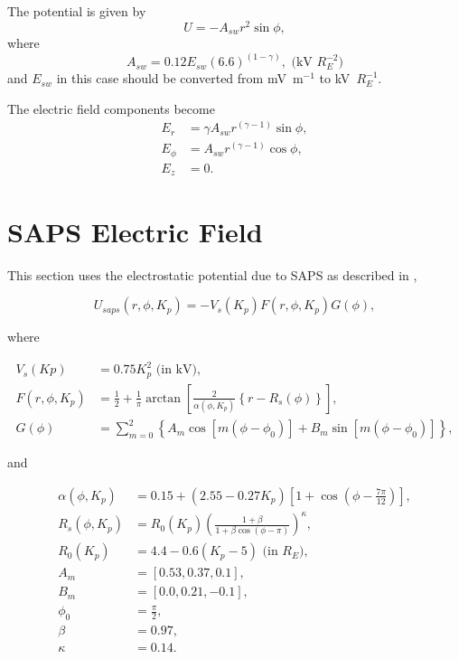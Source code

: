 \documentclass[]{article}
\begin{document}
The potential is given by 
\begin{equation}
	U = -A_{sw} r^2 \sin{\phi},
\end{equation}
where 
\begin{equation}
	A_{sw} = 0.12 E_{sw} (6.6)^{(1-\gamma)}, \text{ (kV $R_E^{-2}$)}
\end{equation}
and $E_{sw}$ in this case should be converted from mV~m$^{-1}$ to kV~$R_E^{-1}$.

The electric field components become
\begin{align}
E_r &= \gamma A_{sw} r^{(\gamma-1)}\sin{\phi},\\
E_\phi &= A_{sw} r^{(\gamma-1)} \cos{\phi},\\
E_z &= 0.
\end{align}


\section{SAPS Electric Field}

	This section uses the electrostatic potential due to SAPS as described in \citet{Goldstein2005},
	
	\begin{equation}
		U_{saps}(r,\phi,K_p) = -V_s(K_p) F(r,\phi,K_p) G(\phi),
	\end{equation}

	where
	
	\begin{align}
		V_s(Kp) &= 0.75 K_p^2 \text{ (in kV)}, \\
		F(r,\phi,K_p) &= \frac{1}{2} + \frac{1}{\pi}\arctan{\left[\frac{2}{\alpha(\phi,K_p)}\left\{ r - R_s(\phi)\right\}\right]}, \\
		G(\phi) &= \sum_{m=0}^{2} \left\{A_m \cos{[m(\phi - \phi_0)]} + B_m \sin{[m(\phi-\phi_0)]} \right\},
	\end{align}
	
	and
	
	\begin{align}
		\alpha(\phi,K_p) &= 0.15 + (2.55 - 0.27 K_p)\left[1 + \cos{\left(\phi - \frac{7\pi}{12}\right)}\right], \\
		R_s(\phi,K_p) &= R_0(K_p)\left(\frac{1+\beta}{1 + \beta\cos{(\phi-\pi)}}\right)^\kappa, \\
		R_0(K_p) &= 4.4 - 0.6(K_p - 5) \text{ (in $R_E$)},\\
		A_m &= [0.53,0.37,0.1],\\
		B_m &= [0.0,0.21,-0.1],\\
		\phi_0 &= \frac{\pi}{2}, \\
		\beta &= 0.97,\\
		\kappa &= 0.14.
	\end{align}
	
\end{document}
